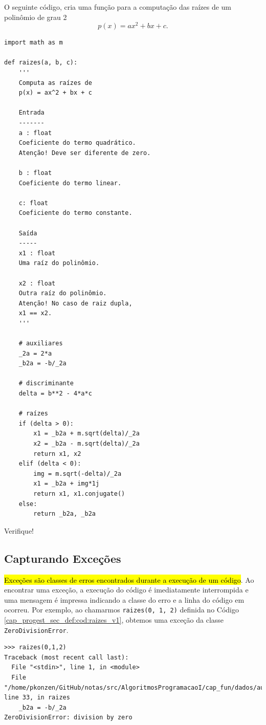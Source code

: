 \begin{ex}
  O seguinte código, cria uma função para a computação das raízes de um polinômio de grau 2
  \begin{equation}
    p(x) = ax^2 + bx + c.
  \end{equation}
\begin{lstlisting}[caption=raizes\_v1.py, label=cap_progest_sec_def:cod:raizes_v1]
import math as m

def raizes(a, b, c):
    '''
    Computa as raízes de
    p(x) = ax^2 + bx + c

    Entrada
    -------
    a : float
    Coeficiente do termo quadrático.
    Atenção! Deve ser diferente de zero.

    b : float 
    Coeficiente do termo linear.

    c: float
    Coeficiente do termo constante.

    Saída
    -----
    x1 : float
    Uma raíz do polinômio.

    x2 : float
    Outra raíz do polinômio.
    Atenção! No caso de raiz dupla,
    x1 == x2.
    '''

    # auxiliares
    _2a = 2*a
    _b2a = -b/_2a

    # discriminante
    delta = b**2 - 4*a*c

    # raízes
    if (delta > 0):
        x1 = _b2a + m.sqrt(delta)/_2a
        x2 = _b2a - m.sqrt(delta)/_2a
        return x1, x2
    elif (delta < 0):
        img = m.sqrt(-delta)/_2a
        x1 = _b2a + img*1j
        return x1, x1.conjugate()
    else:
        return _b2a, _b2a
\end{lstlisting}
  Verifique!
\end{ex}

\subsection{Capturando Exceções}

\hl{Exceções são classes de erros encontrados durante a execução de um código}. Ao encontrar uma exceção, a execução do código {\python} é imediatamente interrompida e uma mensagem é impressa indicando a classe do erro e a linha do código em ocorreu. Por exemplo, ao chamarmos \lstinline+raizes(0, 1, 2)+ definida no Código \ref{cap_progest_sec_def:cod:raizes_v1}, obtemos uma exceção da classe \lstinline+ZeroDivisionError+.
\begin{lstlisting}
>>> raizes(0,1,2)
Traceback (most recent call last):
  File "<stdin>", line 1, in <module>
  File "/home/pkonzen/GitHub/notas/src/AlgoritmosProgramacaoI/cap_fun/dados/aux.py", line 33, in raizes
    _b2a = -b/_2a
ZeroDivisionError: division by zero
\end{lstlisting}

